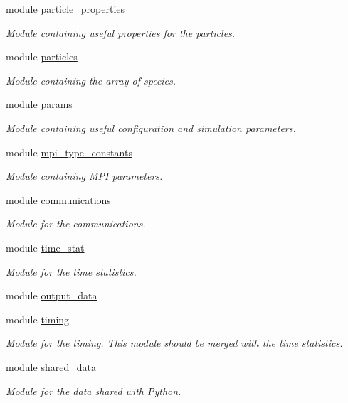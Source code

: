 \begin{DoxyCompactItemize}
module \hyperlink{namespaceparticle__properties}{particle\+\_\+properties}
\begin{DoxyCompactList}\small\item\em Module containing useful properties for the particles. \end{DoxyCompactList}\item 
module \hyperlink{namespaceparticles}{particles}
\begin{DoxyCompactList}\small\item\em Module containing the array of species. \end{DoxyCompactList}\item 
module \hyperlink{namespaceparams}{params}
\begin{DoxyCompactList}\small\item\em Module containing useful configuration and simulation parameters. \end{DoxyCompactList}\item 
module \hyperlink{namespacempi__type__constants}{mpi\+\_\+type\+\_\+constants}
\begin{DoxyCompactList}\small\item\em Module containing M\+PI parameters. \end{DoxyCompactList}\item 
module \hyperlink{namespacecommunications}{communications}
\begin{DoxyCompactList}\small\item\em Module for the communications. \end{DoxyCompactList}\item 
module \hyperlink{namespacetime__stat}{time\+\_\+stat}
\begin{DoxyCompactList}\small\item\em Module for the time statistics. \end{DoxyCompactList}\item 
module \hyperlink{namespaceoutput__data}{output\+\_\+data}
\item 
module \hyperlink{namespacetiming}{timing}
\begin{DoxyCompactList}\small\item\em Module for the timing. This module should be merged with the time statistics. \end{DoxyCompactList}\item 
module \hyperlink{namespaceshared__data}{shared\+\_\+data}
\begin{DoxyCompactList}\small\item\em Module for the data shared with Python. \end{DoxyCompactList}\item 

\end{DoxyCompactItemize}
